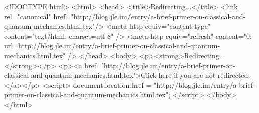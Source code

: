 <!DOCTYPE html>
<html>
<head>
<title>Redirecting...</title>
<link rel="canonical" href="http://blog.jle.im/entry/a-brief-primer-on-classical-and-quantum-mechanics.html.tex"/>
<meta http-equiv="content-type" content="text/html; charset=utf-8" />
<meta http-equiv="refresh" content="0; url=http://blog.jle.im/entry/a-brief-primer-on-classical-and-quantum-mechanics.html.tex" />
</head>
<body>
  <p><strong>Redirecting...</strong></p>
  <p><a href='http://blog.jle.im/entry/a-brief-primer-on-classical-and-quantum-mechanics.html.tex'>Click here if you are not redirected.</a></p>
  <script>
    document.location.href = "http://blog.jle.im/entry/a-brief-primer-on-classical-and-quantum-mechanics.html.tex";
  </script>
</body>
</html>

